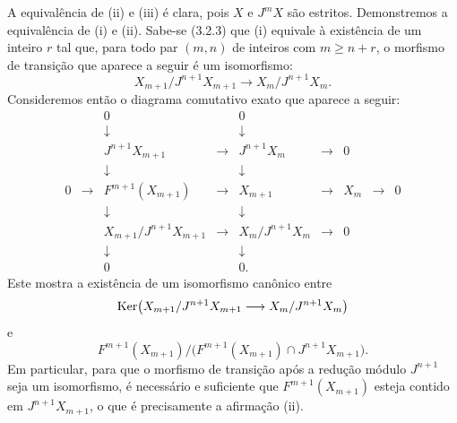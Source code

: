 \begin{prooftext}
A equivalência de (ii) e (iii) é clara, pois \(X\) e \(J^mX\) são estritos. Demonstremos a equivalência de (i) e (ii). Sabe-se (3.2.3) que (i) equivale à existência de um inteiro \(r\) tal que, para todo par \((m,n)\) de inteiros com \(m\ge n+r\), o morfismo de transição que aparece a seguir é um isomorfismo:
\[
X_{m+1}/J^{n+1}X_{m+1}\longrightarrow X_m/J^{n+1}X_m.
\]
Consideremos então o diagrama comutativo exato que aparece a seguir:
\[
\begin{array}{ccccccccccc}
&&0&&0\\
&&\downarrow&&\downarrow\\
&&J^{n+1}X_{m+1}&\longrightarrow&J^{n+1}X_m&\longrightarrow&0\\
&&\downarrow&&\downarrow\\
0&\longrightarrow&F^{m+1}(X_{m+1})&\longrightarrow&X_{m+1}&\longrightarrow&X_m&\longrightarrow&0\\
&&\downarrow&&\downarrow\\
&&X_{m+1}/J^{n+1}X_{m+1}&\longrightarrow&X_m/J^{n+1}X_m&\longrightarrow&0\\
&&\downarrow&&\downarrow\\
&&0&&0 .
\end{array}
\]
Este mostra a existência de um isomorfismo canônico entre
\[
\operatorname{Ker}\bigl(X_{m+1}/J^{n+1}X_{m+1}
       \longrightarrow X_m/J^{n+1}X_m\bigr)
\]
e
\[
F^{m+1}(X_{m+1})/
\bigl(F^{m+1}(X_{m+1})\cap J^{n+1}X_{m+1}\bigr).
\]
Em particular, para que o morfismo de transição após a redução módulo \(J^{n+1}\) seja um isomorfismo, é necessário e suficiente que \(F^{m+1}(X_{m+1})\) esteja contido em \(J^{n+1}X_{m+1}\), o que é precisamente a afirmação (ii).
\end{prooftext}

